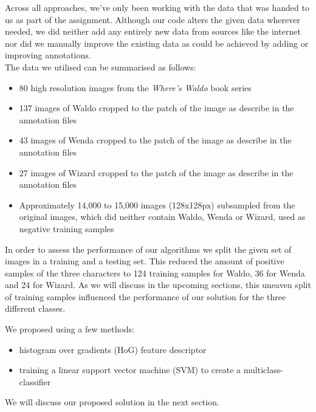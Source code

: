 \documentclass[11pt]{article}
\begin{document}
Across all approaches, we've only been working with the data that was handed to us as part of the assignment. Although our code alters the given data wherever needed, we did neither add any entirely new data from sources like the internet nor did we manually improve the existing data as could be achieved by adding or improving annotations.\\

The data we utilised can be summarised as follows:

\begin{itemize}
    \item 80 high resolution images from the \textit{Where's Waldo} book series
    \item 137 images of Waldo cropped to the patch of the image as describe in the annotation files
    \item 43 images of Wenda cropped to the patch of the image as describe in the annotation files
    \item 27 images of Wizard cropped to the patch of the image as describe in the annotation files
    \item Approximately 14,000 to 15,000 images (128x128px) subsampled from the original images, which did neither contain Waldo, Wenda or Wizard, used as negative training samples
\end{itemize}

In order to assess the performance of our algorithms we split the given set of images in a training and a testing set. This reduced the amount of positive samples of the three characters to 124 training samples for Waldo, 36 for Wenda and 24 for Wizard. As we will discuss in the upcoming sections, this uneaven split of training samples influenced the performance of our solution for the three different classes. 

We proposed using a few methods:

\begin{itemize}
    \item histogram over gradients (HoG) feature descriptor
    \item training a linear support vector machine (SVM) to create a multiclass-classifier
\end{itemize}

We will discuss our proposed solution in the next section.\\
\end{document}
